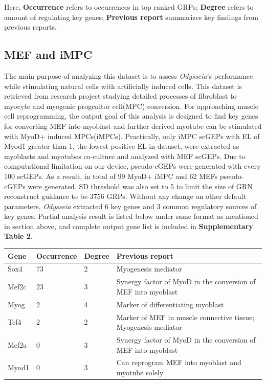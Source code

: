 \documentclass[fleqn,10pt]{wlscirep}
\begin{document}
Here, \textbf{Occurrence} refers to occurrences in top ranked GRPs; \textbf{Degree} refers to amount of regulating key genes; \textbf{Previous report} summarizes key findings from previous reports.

\subsection*{MEF and iMPC}
The main purpose of analyzing this dataset is to assess \emph{Odysseia}'s performance while stimulating natural cells with artificially induced cells.
This dataset is retrieved from research project studying detailed processes of fibroblast to myocyte and myogenic progenitor cell(MPC) conversion.\cite{mef_iMPC_ETH}
For approaching muscle cell reprogramming, the output goal of this analysis is designed to find key genes for converting MEF into myoblast and further derived myotube can be stimulated with MyoD+ induced MPCs(iMPCs)\cite{mpc_as_myoblast}.
Practically, only iMPC scGEPs with EL of Myod1 greater than 1, the lowest positive EL in dataset, were extracted as myoblasts and myotubes co-culture and analyzed with MEF scGEPs.
Due to computational limitation on our device, pseudo-cGEPs were generated with every 100 scGEPs.
As a result, in total of 99 MyoD+ iMPC and 62 MEFs pseudo-cGEPs were generated.
SD threshold was also set to 5 to limit the size of GRN reconstruct guidance to be 3756 GRPs.
Without any change on other default parameters, \emph{Odysseia} extracted 6 key genes and 3 common regulatory sources of key genes.
Partial analysis result is listed below under same format as mentioned in section above, and complete output gene list is included in \textbf{Supplementary Table 2}.

\begin{table}[ht]
\centering
\begin{tabular}{|l|l|l|l|}
\hline
\textbf{Gene} & \textbf{Occurrence} & \textbf{Degree} & \textbf{Previous report}  \\
\hline
Sox4 & 73 & 2 & Myogenesis mediator\cite{sox4_2013, myogenic_repro_2018} \\
\hline
Mef2c & 23 & 3 & Synergy factor of MyoD in the conversion of MEF into myoblast\cite{mef2_2017, mef2_skeletal}\\
\hline
Myog & 2 & 4 & Marker of differentiating myoblast\cite{myog_1996, myog_2017} \\
\hline
Tcf4 & 2 & 2 & Marker of MEF in muscle connective tissue; Myogenesis mediator\cite{tcf4_2011, tcf4_2016, tcf4_2017}\\
\hline
Mef2a & 0 & 3 & Synergy factor of MyoD in the conversion of MEF into myoblast\cite{mef2_2017, mef2_skeletal}\\
\hline
Myod1 & 0 & 3 & Can reprogram MEF into myoblast and myotube solely\cite{mef_iMPC_ETH, myod_1990, myod_crispr} \\
\hline
\end{tabular}
\end{table}
\end{document}

